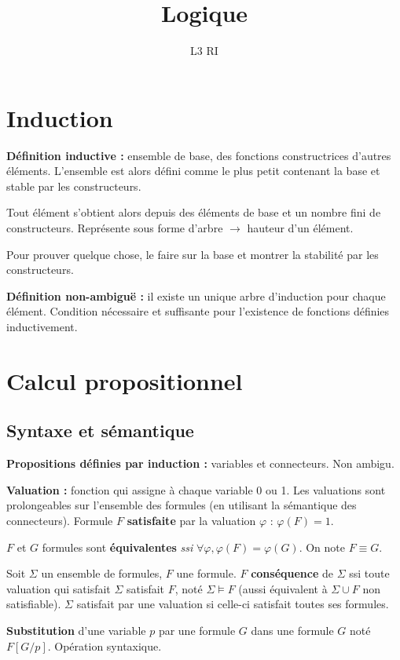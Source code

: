 \documentclass[french]{article}
\title{Logique}
\date{}
\author{L3 RI}
\begin{document}
\maketitle
\tableofcontents
\newpage
\section{Induction}

\textbf{Définition inductive :} ensemble de base, des fonctions constructrices d'autres éléments. L'ensemble est alors défini comme le plus petit contenant la base et stable par les constructeurs.

Tout élément s'obtient alors depuis des éléments de base et un nombre fini de constructeurs. Représente sous forme d'arbre $\rightarrow$ hauteur d'un élément.

Pour prouver quelque chose, le faire sur la base et montrer la stabilité par les constructeurs.

\textbf{Définition non-ambiguë :} il existe un unique arbre d'induction pour chaque élément. Condition nécessaire et suffisante pour l'existence de fonctions définies inductivement.

\section{Calcul propositionnel}
\subsection{Syntaxe et sémantique}
\textbf{Propositions définies par induction :} variables et connecteurs. Non ambigu.

\textbf{Valuation : }fonction qui assigne à chaque variable 0 ou 1.
Les valuations sont prolongeables sur l'ensemble des formules (en utilisant la sémantique des connecteurs). Formule $F$ \textbf{satisfaite} par la valuation $\varphi$ : $\varphi (F) = 1$.

$F$ et $G$ formules sont \textbf{équivalentes} \emph{ssi} $\forall\varphi ,\varphi (F) = \varphi (G)$. On note $F\equiv G$. 

Soit $\Sigma$ un ensemble de formules, $F$ une formule. $F$ \textbf{conséquence} de $\Sigma$ ssi toute valuation qui satisfait $\Sigma$ satisfait $F$, noté $\Sigma\models F$ (aussi équivalent à $\Sigma\cup F$ non satisfiable). $\Sigma$ satisfait par une valuation si celle-ci satisfait toutes ses formules.

\textbf{Substitution} d'une variable $p$ par une formule $G$ dans une formule $G$ noté $F[G/p]$. Opération syntaxique.
\end{document}
